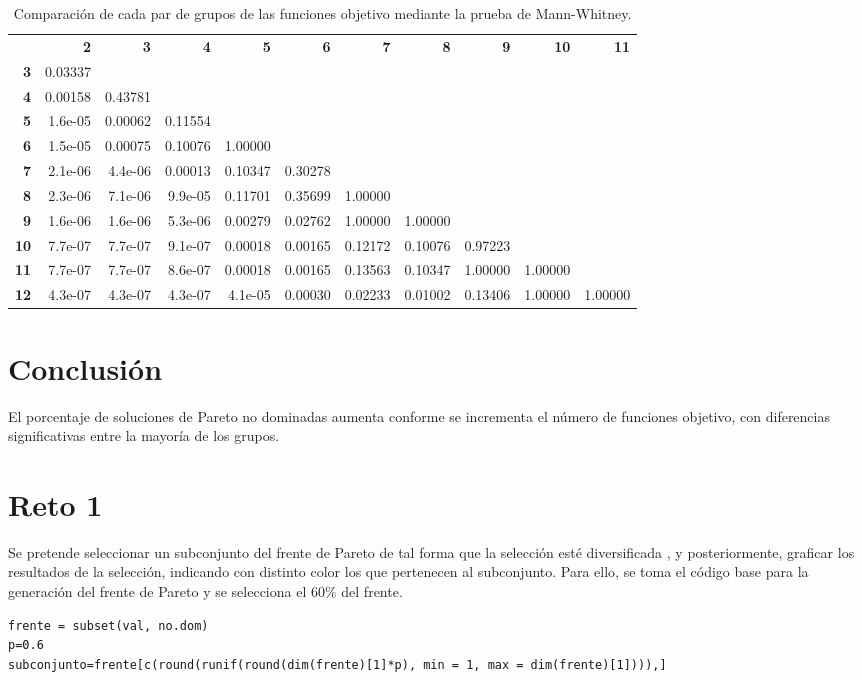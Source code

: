 \documentclass{article}
\begin{document}
\begin{table}[h]
\begin{center}
\caption{Comparación de cada par de grupos de las funciones objetivo mediante la prueba de Mann-Whitney.}
\label{mw}
\tabcolsep=0.11cm
\small
\begin{tabular}{r r r r r r r r r r r}
\hline
 &\textbf{2}&\textbf{3}&\textbf{4}&\textbf{5}&\textbf{6}&\textbf{7}&\textbf{8}&\textbf{9}&\textbf{10}&\textbf{11}\\
\textbf{3}&0.03337& & & & & & & & & \\
\textbf{4}&0.00158&0.43781& & & & & & & & \\
\textbf{5}&1.6e-05&0.00062&0.11554& & & & & & & \\
\textbf{6}&1.5e-05&0.00075&0.10076&1.00000& & & & & & \\
\textbf{7}&2.1e-06&4.4e-06&0.00013&0.10347&0.30278& & & & & \\
\textbf{8}&2.3e-06&7.1e-06&9.9e-05&0.11701&0.35699&1.00000& & & & \\
\textbf{9}&1.6e-06&1.6e-06&5.3e-06&0.00279&0.02762&1.00000&1.00000& & & \\
\textbf{10}&7.7e-07&7.7e-07&9.1e-07&0.00018&0.00165&0.12172&0.10076&0.97223& & \\
\textbf{11}&7.7e-07&7.7e-07&8.6e-07&0.00018&0.00165&0.13563&0.10347&1.00000&1.00000& \\
\textbf{12}&4.3e-07&4.3e-07&4.3e-07&4.1e-05&0.00030&0.02233&0.01002&0.13406&1.00000&1.00000\\
\hline
\end{tabular}
\end{center}
\end{table}

\section{Conclusión}
El porcentaje de soluciones de Pareto no dominadas aumenta conforme se incrementa el número de funciones objetivo, con diferencias significativas entre la mayoría de los grupos.

\section{Reto 1}
Se pretende seleccionar un subconjunto del frente de Pareto de tal forma que la selección esté diversificada \cite{dra}, y posteriormente, graficar los resultados de la selección, indicando con distinto color los que pertenecen al subconjunto.
Para ello, se toma el código base para la generación del frente de Pareto \cite{dra,ric} y se selecciona el $60\%$ del frente.
\begin{lstlisting}
frente = subset(val, no.dom) 
p=0.6
subconjunto=frente[c(round(runif(round(dim(frente)[1]*p), min = 1, max = dim(frente)[1]))),]
\end{lstlisting}
\end{document}
